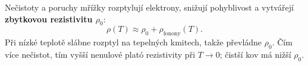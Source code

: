 Nečistoty a poruchy mřížky rozptylují elektrony, snižují pohyblivost a vytvářejí \textbf{zbytkovou rezistivitu $\rho_0$}:
\[\rho(T)\approx\rho_0+\rho_{\mathrm{fonony}}(T).\]
Při nízké teplotě slábne rozptyl na tepelných kmitech, takže převládne $\rho_0$. Čím více nečistot, tím vyšší nenulové plató rezistivity při $T\to0$; čistší kov má nižší $\rho_0$.
